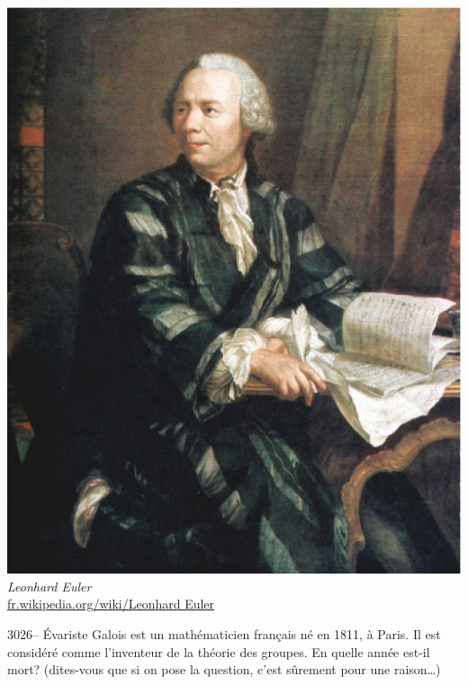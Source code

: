 \documentclass[letterpaper, 12pt]{article}
\begin{document}
\begin{center}
\includegraphics[scale=0.15]{Euler.eps}\\
\emph{{\small Leonhard Euler}}\\
\href{http://fr.wikipedia.org/wiki/Leonhard Euler}{fr.wikipedia.org/wiki/Leonhard Euler}\\[5mm]
\end{center}



3026-- \'Evariste Galois est un math\'ematicien fran\c cais n\'e en 1811, \`a Paris. Il est consid\'er\'e comme l'inventeur de la th\'eorie des groupes. En quelle ann\'ee est-il mort? (dites-vous que si on pose la question, c'est s\^urement pour une raison\dots)\\
\end{document}

